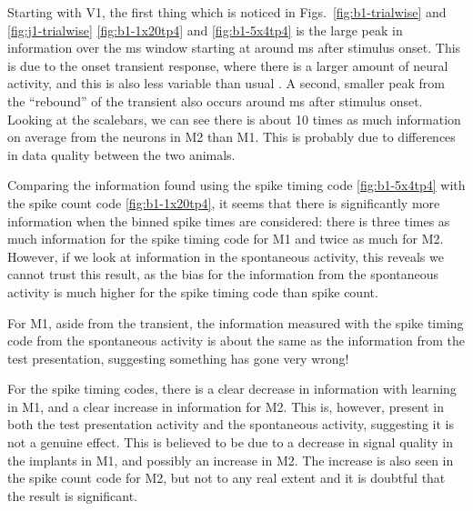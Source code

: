 
Starting with V1, the first thing which is noticed in Figs.~\ref{fig:b1-trialwise} and \ref{fig:j1-trialwise} \ref{fig:b1-1x20tp4} and \ref{fig:b1-5x4tp4} is the large peak in information over the \unit[20]{ms} window starting at around \unit[40]{ms} after stimulus onset. This is due to the onset transient response, where there is a larger amount of neural activity, and this is also less variable than usual \cite{Muller2001}. A second, smaller peak from the ``rebound'' of the transient also occurs around \unit[100]{ms} after stimulus onset. Looking at the scalebars, we can see there is about 10 times as much information on average from the neurons in M2 than M1. This is probably due to differences in data quality between the two animals.

Comparing the information found using the spike timing code \ref{fig:b1-5x4tp4} with the spike count code \ref{fig:b1-1x20tp4}, it seems that there is significantly more information when the binned spike times are considered: there is three times as much information for the spike timing code for M1 and twice as much for M2. However, if we look at information in the spontaneous activity, this reveals we cannot trust this result, as the bias for the information from the spontaneous activity is much higher for the spike timing code than spike count.

For M1, aside from the transient, the information measured with the spike timing code from the spontaneous activity is about the same as the information from the test presentation, suggesting something has gone very wrong!

For the spike timing codes, there is a clear decrease in information with learning in M1, and a clear increase in information for M2. This is, however, present in both the test presentation activity and the spontaneous activity, suggesting it is not a genuine effect. This is believed to be due to a decrease in signal quality in the implants in M1, and possibly an increase in M2.
The increase is also seen in the spike count code for M2, but not to any real extent and it is doubtful that the result is significant.

